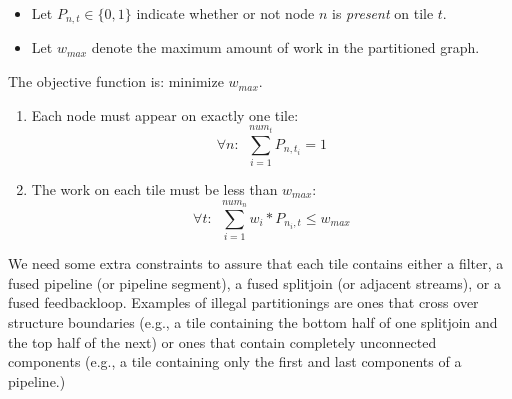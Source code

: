 \documentclass[12pt]{article}
\begin{document}
  \begin{itemize}

  \item Let $P_{n,t} \in \{0,1\}$ indicate whether or not node $n$ is
  {\it present} on tile $t$.

  \item Let $w_{max}$ denote the maximum amount of work in the
  partitioned graph.

  \end{itemize}


  The objective function is: minimize $w_{max}$.


  \begin{enumerate}

    \item Each node must appear on exactly one tile:
      \[
      \forall n:~~\sum_{i=1}^{num_t} P_{n,t_i} = 1
      \]

    \item The work on each tile must be less than $w_{max}$:
      \[
      \forall t:~~\sum_{i=1}^{num_n} w_i * P_{n_i,t} \le w_{max}
      \]

  \end{enumerate}


  We need some extra constraints to assure that each tile contains
  either a filter, a fused pipeline (or pipeline segment), a fused
  splitjoin (or adjacent streams), or a fused feedbackloop.  Examples
  of illegal partitionings are ones that cross over structure
  boundaries (e.g., a tile containing the bottom half of one splitjoin
  and the top half of the next) or ones that contain completely
  unconnected components (e.g., a tile containing only the first and
  last components of a pipeline.)
\end{document}
